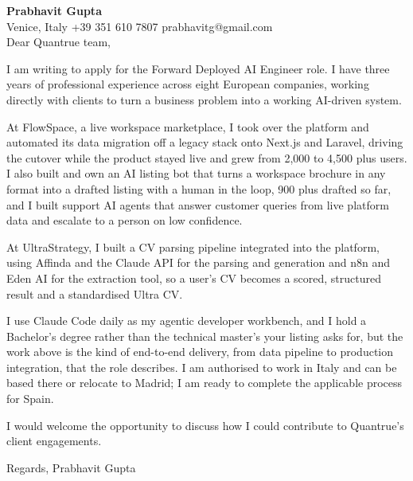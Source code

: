 \documentclass[a4paper,10.5pt]{article}
\begin{document}
\textbf{Prabhavit Gupta}\\
Venice, Italy \textbar{} +39 351 610 7807 \textbar{} prabhavitg@gmail.com\\[10pt]
Dear Quantrue team,

I am writing to apply for the Forward Deployed AI Engineer role. I have three years of professional experience across eight European companies, working directly with clients to turn a business problem into a working AI-driven system.

At FlowSpace, a live workspace marketplace, I took over the platform and automated its data migration off a legacy stack onto Next.js and Laravel, driving the cutover while the product stayed live and grew from 2,000 to 4,500 plus users. I also built and own an AI listing bot that turns a workspace brochure in any format into a drafted listing with a human in the loop, 900 plus drafted so far, and I built support AI agents that answer customer queries from live platform data and escalate to a person on low confidence.

At UltraStrategy, I built a CV parsing pipeline integrated into the platform, using Affinda and the Claude API for the parsing and generation and n8n and Eden AI for the extraction tool, so a user's CV becomes a scored, structured result and a standardised Ultra CV.

I use Claude Code daily as my agentic developer workbench, and I hold a Bachelor's degree rather than the technical master's your listing asks for, but the work above is the kind of end-to-end delivery, from data pipeline to production integration, that the role describes. I am authorised to work in Italy and can be based there or relocate to Madrid; I am ready to complete the applicable process for Spain.

I would welcome the opportunity to discuss how I could contribute to Quantrue's client engagements.

Regards,
Prabhavit Gupta
\end{document}
